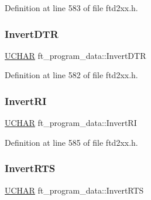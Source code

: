 Definition at line 583 of file ftd2xx.\+h.

\mbox{\label{structft__program__data_af1ad28c6b71e397b08a3bda07a2f0329}} 
\subsubsection{\texorpdfstring{Invert\+D\+TR}{InvertDTR}}
{\footnotesize\ttfamily \hyperlink{CatCaloProto40MHz_2inc_2WinTypes_8h_a4f4bb67531a9bf6f0b9c6ad76aeba587}{U\+C\+H\+AR} ft\+\_\+program\+\_\+data\+::\+Invert\+D\+TR}



Definition at line 582 of file ftd2xx.\+h.

\mbox{\label{structft__program__data_a488afb1f4d72b128ea44a1e4d5131172}} 
\subsubsection{\texorpdfstring{Invert\+RI}{InvertRI}}
{\footnotesize\ttfamily \hyperlink{CatCaloProto40MHz_2inc_2WinTypes_8h_a4f4bb67531a9bf6f0b9c6ad76aeba587}{U\+C\+H\+AR} ft\+\_\+program\+\_\+data\+::\+Invert\+RI}



Definition at line 585 of file ftd2xx.\+h.

\mbox{\label{structft__program__data_a709debf56fb2654291febd83d6e23161}} 
\subsubsection{\texorpdfstring{Invert\+R\+TS}{InvertRTS}}
{\footnotesize\ttfamily \hyperlink{CatCaloProto40MHz_2inc_2WinTypes_8h_a4f4bb67531a9bf6f0b9c6ad76aeba587}{U\+C\+H\+AR} ft\+\_\+program\+\_\+data\+::\+Invert\+R\+TS}



